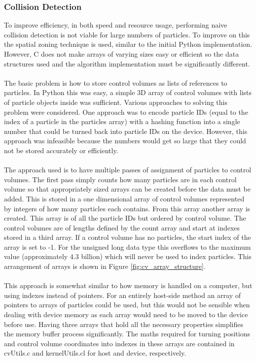 \documentclass[a4paper,11pt,titlepage]{report}
\begin{document}
\subsubsection{Collision Detection}
\label{sec:OpenCL Collision Detection}
To improve efficiency, in both speed and resource usage, performing naive collision detection is not viable for large numbers of particles. To improve on this the spatial zoning technique is used, similar to the initial Python implementation. However, C does not make arrays of varying sizes easy or efficient so the data structures used and the algorithm implementation must be significantly different.
\\\\The basic problem is how to store control volumes as lists of references to particles. In Python this was easy, a simple 3D array of control volumes with lists of particle objects inside was sufficient. Various approaches to solving this problem were considered. One approach was to encode particle IDs (equal to the index of a particle in the particles array) with a hashing function into a single number that could be turned back into particle IDs on the device. However, this approach was infeasible because the numbers would get so large that they could not be stored accurately or efficiently.
\\\\The approach used is to have multiple passes of assignment of particles to control volumes. The first pass simply counts how many particles are in each control volume so that appropriately sized arrays can be created before the data must be added. This is stored in a one dimensional array of control volumes represented by integers of how many particles each contains. From this array another array is created. This array is of all the particle IDs but ordered by control volume. The control volumes are of lengths defined by the count array and start at indexes stored in a third array. If a control volume has no particles, the start index of the array is set to -1. For the unsigned long data type this overflows to the maximum value (approximately 4.3 billion) which will never be used to index particles. This arrangement of arrays is shown in Figure \ref{fig:cv_array_structure}.
\\\\This approach is somewhat similar to how memory is handled on a computer, but using indexes instead of pointers. For an entirely host-side method an array of pointers to arrays of particles could be used, but this would not be sensible when dealing with device memory as each array would need to be moved to the device before use. Having three arrays that hold all the necessary properties simplifies the memory buffer process significantly. The maths required for turning positions and control volume coordinates into indexes in these arrays are contained in cvUtils.c and kernelUtils.cl for host and device, respectively.
\end{document}
